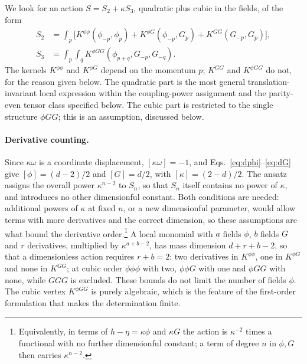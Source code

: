 \documentclass[prd,aps,preprint,nofootinbib,amsmath,amssymb,eqsecnum]{revtex4-2}
\newcommand{\ip}[1]{\int_{#1}}
\begin{document}
We look for an action $S=S_2+\kappa S_3$, quadratic plus cubic in the fields, of the form
\begin{equation}
\begin{aligned}
S_2&=\ip{p}\Big[K^{\phi\phi}(\phi_{-p},\phi_p)+K^{\phi G}(\phi_{-p},G_p)+K^{GG}(G_{-p},G_p)\Big],\\
S_3&=\ip{p}\ip{q}K^{\phi GG}(\phi_{p+q},G_{-p},G_{-q}).
\end{aligned}
\label{eq:ansatz}
\end{equation}
The kernels $K^{\phi\phi}$ and $K^{\phi G}$ depend on the momentum $p$; $K^{GG}$ and
$K^{\phi GG}$ do not, for the reason given below.
The quadratic part is the most general translation-invariant local expression within the
coupling-power assignment and the parity-even tensor class specified below. The cubic part
is restricted to the single structure $\phi GG$; this is an assumption, discussed below.

\paragraph{Derivative counting.} Since $\kappa\omega$ is a coordinate displacement,
$[\kappa\omega]=-1$, and Eqs.~\eqref{eq:dphi}--\eqref{eq:dG} give $[\phi]=(d-2)/2$ and
$[G]=d/2$, with $[\kappa]=(2-d)/2$. The ansatz assigns the overall power $\kappa^{n-2}$ to $S_n$, so
that $S_n$ itself contains no power of $\kappa$, and introduces no other dimensionful
constant. Both conditions are needed: additional powers of $\kappa$ at fixed $n$, or a new
dimensionful parameter, would allow terms with more derivatives and the correct dimension,
so these assumptions are what bound the derivative order.\footnote{Equivalently, in terms of $h-\eta=\kappa\phi$ and
$\kappa G$ the action is $\kappa^{-2}$ times a functional with no further dimensionful
constant; a term of degree $n$ in $\phi,G$ then carries $\kappa^{n-2}$.} A local monomial with $a$ fields $\phi$, $b$
fields $G$ and $r$ derivatives, multiplied by $\kappa^{a+b-2}$, has mass dimension $d+r+b-2$,
so that a dimensionless action requires $r+b=2$: two derivatives in $K^{\phi\phi}$, one in
$K^{\phi G}$ and none in $K^{GG}$; at cubic order $\phi\phi\phi$ with two, $\phi\phi G$ with
one and $\phi GG$ with none, while $GGG$ is excluded. These bounds do not limit the number of
fields $\phi$. The cubic vertex $K^{\phi GG}$ is purely algebraic, which is the feature of the
first-order formulation that makes the determination finite.
\end{document}
